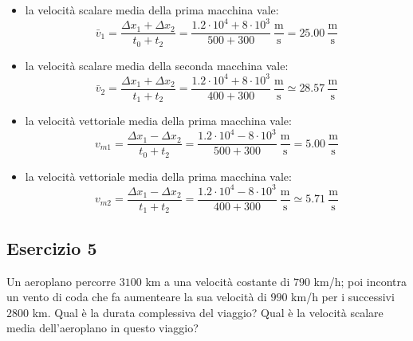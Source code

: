 \documentclass[12pt,a4paper]{book}
\begin{document}
\begin{itemize}
\item{la velocità scalare media della prima macchina vale:\\
\begin{equation*}
\bar{v}_1 = \frac{\Delta x_1 + \Delta x_2}{t_0 + t_2}= \frac{1.2\cdot 10^4 + 8\cdot 10^3}{500 + 300} \: \frac{\text{m}}{\text{s}}= 25.00 \: \frac{\text{m}}{\text{s}}
\end{equation*}}
\item{la velocità scalare media della seconda macchina vale:\\
\begin{equation*}
\bar{v}_2 = \frac{\Delta x_1 + \Delta x_2}{t_1 + t_2}= \frac{1.2\cdot 10^4 + 8\cdot 10^3}{400 + 300} \: \frac{\text{m}}{\text{s}}\simeq 28.57 \: \frac{\text{m}}{\text{s}}
\end{equation*}}
\item{la velocità vettoriale media della prima macchina vale:\\
\begin{equation*}
v_{m1} = \frac{\Delta x_1 - \Delta x_2}{t_0 + t_2}= \frac{1.2\cdot 10^4 - 8\cdot 10^3}{500 + 300} \: \frac{\text{m}}{\text{s}}= 5.00 \: \frac{\text{m}}{\text{s}}
\end{equation*}}
\item{la velocità vettoriale media della prima macchina vale:\\
\begin{equation*}
v_{m2} = \frac{\Delta x_1 - \Delta x_2}{t_1 + t_2}= \frac{1.2\cdot 10^4 - 8\cdot 10^3}{400 + 300} \: \frac{\text{m}}{\text{s}}\simeq 5.71 \: \frac{\text{m}}{\text{s}}
\end{equation*}}
\end{itemize}


\subsection*{Esercizio 5}
Un aeroplano percorre $3100$ km a una velocità costante di $790$ km/h; poi incontra un vento di coda che fa aumenteare la sua velocità di $990$ km/h per i successivi $2800$ km. Qual è la durata complessiva del viaggio? Qual è la velocità scalare media dell'aeroplano in questo viaggio?
\end{document}
